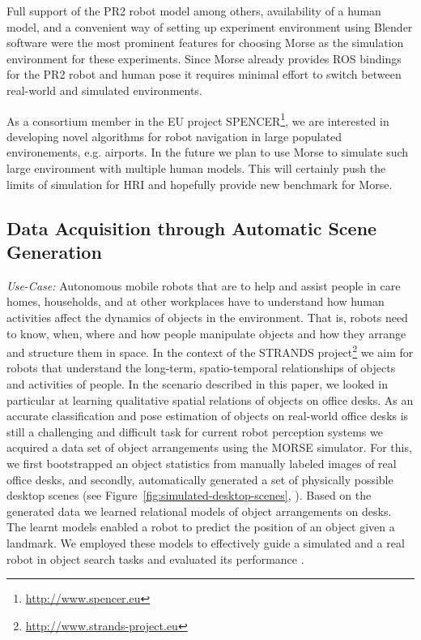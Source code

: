 \documentclass[conference]{IEEEtran}
\begin{document}
Full support of the PR2 robot model among others, availability of a human model,
and a convenient way of setting up experiment environment using Blender software
were the most prominent features for choosing Morse as the simulation
environment for these experiments. Since Morse already provides ROS bindings for
the PR2 robot and human pose it requires minimal effort to switch between
real-world and simulated environments.

As a consortium member in the EU project
SPENCER\footnote{\url{http://www.spencer.eu}}, we are interested in developing
novel algorithms for robot navigation in large populated environements,
e.g. airports. In the future we plan to use Morse to simulate such large
environment with multiple human models. This will certainly push the limits of
simulation for HRI and hopefully provide new benchmark for Morse.


\subsection{Data Acquisition through Automatic Scene Generation}
\label{sc:generation}

\emph{Use-Case:} Autonomous mobile robots that are to help and assist people in
care homes, households, and at other workplaces have to understand how human
activities affect the dynamics of objects in the environment. That is, robots
need to know, when, where and how people manipulate objects and how they
arrange and structure them in space. In the context of the STRANDS
project\footnote{\url{http://www.strands-project.eu}} we aim for robots that
understand the long-term, spatio-temporal relationships of objects and
activities of people. In the scenario described in this paper, we looked in
particular at learning qualitative spatial relations of objects on office
desks. As an accurate classification and pose estimation of objects on
real-world office desks is still a challenging and difficult task for current
robot perception systems we acquired a data set of object arrangements using
the MORSE simulator. For this, we first bootstrapped an object statistics from
manually labeled images of real office desks, and secondly, automatically
generated a set of physically possible desktop scenes (see
Figure~\ref{fig:simulated-desktop-scenes}, \cite{kunze14bootstrapping}). Based
on the generated data we learned relational models of object arrangements on
desks. The learnt models enabled a robot to predict the position of an object
given a landmark. We employed these models to effectively guide a simulated and
a real robot in object search tasks and evaluated its performance
\cite{kunze14indirect}.
\end{document}
